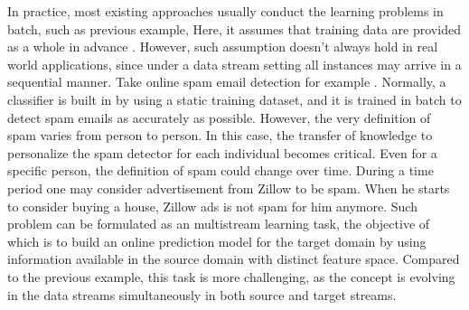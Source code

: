In practice, most existing approaches usually conduct the learning problems in batch, such as previous example, Here, it 
assumes that training data are provided as a whole in advance \cite{pan2010survey}. However, such assumption 
doesn't always hold in real world applications, since under a data stream setting all 
instances may arrive in a sequential manner. Take online spam email detection for example \cite{chen2015opinion}. 
Normally, a classifier is built in by using a static training dataset, and it is trained in batch to
detect spam emails as accurately as possible. However, the very definition of spam varies from 
person to person. In this case, the transfer of knowledge to personalize the spam detector for each 
individual becomes critical. Even for a specific person, the definition of spam could change over time. During a 
time period one may consider advertisement from Zillow to be spam. When he starts to consider buying a house,
Zillow ads is not spam for him anymore. Such problem can be formulated as an multistream learning task, the 
objective of which is to build an online prediction model for the target domain by using information 
available in the source domain with distinct feature space. Compared to the previous example, this task 
is more challenging, as the concept is evolving in the data streams simultaneously in both source and target streams.



